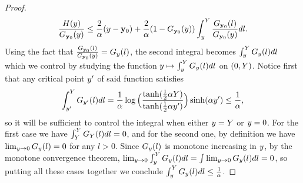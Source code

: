 \begin{proof}
\[\frac{H(y)}{G_{{\bf y}_0}(y)}\leq\frac{2}{\alpha}(y-{\bf y}_0)+\frac{2}{\alpha}(1-G_{{\bf y}_0}(y))\int_{y}^Y \frac{G_{{\bf y}_0}(l)}{G_{{\bf y}_0}(y)}dl.\]
Using the fact that $\frac{G_{{\bf y}_0}(l)}{G_{{\bf y}_0}(y)}=G_{y}(l)$, the second integral becomes $\int_{y}^Y G_{y}(l)dl$ which we control by studying the function $y\mapsto \int_{y}^Y G_{y}(l)dl$ on $(0,Y)$. Notice first that any critical point $y'$ of said function satisfies
\[\int_{y'}^Y G_{y'}(l)dl=\frac{1}{\alpha}\log\Big(\frac{\tanh(\frac12\alpha Y)}{\tanh(\frac12\alpha y')}\Big)\sinh(\alpha y')\leq\frac{1}{\alpha},\]
so it will be sufficient to control the integral when either $y=Y$ or $y=0$. For the first case we have $\int_{Y}^Y G_{Y}(l)dl=0$, and for the second one, by definition we have $\lim_{y\to 0}G_{y}(l)=0$ for any $l>0$. 
Since $G_y(l)$ is monotone increasing in $y$, by the monotone convergence theorem, $\lim_{y\to 0}\int_y^Y G_{y}(l)dl=\int \lim_{y \to 0} G_y(l) dl=0$, so putting all these cases together we conclude $\int_y^Y G_{y}(l)dl\leq \frac{1}{\alpha}$.
\end{proof}

